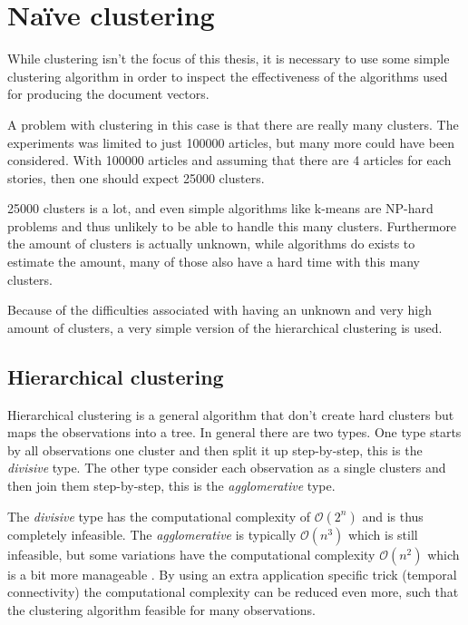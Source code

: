 \section{Naïve clustering}

While clustering isn't the focus of this thesis, it is necessary to use some simple clustering algorithm in order to inspect the effectiveness of the algorithms used for producing the document vectors.

A problem with clustering in this case is that there are really many clusters. The experiments was limited to just 100000 articles, but many more could have been considered. With 100000 articles and assuming that there are 4 articles for each stories, then one should expect 25000 clusters.

25000 clusters is a lot, and even simple algorithms like k-means are NP-hard problems and thus unlikely to be able to handle this many clusters. Furthermore the amount of clusters is actually unknown, while algorithms do exists to estimate the amount, many of those also have a hard time with this many clusters.

Because of the difficulties associated with having an unknown and very high amount of clusters, a very simple version of the hierarchical clustering is used.

\subsection{Hierarchical clustering}

Hierarchical clustering is a general algorithm that don't create hard clusters but maps the observations into a tree. In general there are two types. One type starts by all observations one cluster and then split it up step-by-step, this is the \textit{divisive} type. The other type consider each observation as a single clusters and then join them step-by-step, this is the \textit{agglomerative} type.

The \textit{divisive} type has the computational complexity of $\mathcal{O}(2^n)$ and is thus completely infeasible. The \textit{agglomerative} is typically $\mathcal{O}(n^3)$ which is still infeasible, but some variations have the computational complexity $\mathcal{O}(n^2)$ which is a bit more manageable \cite{wiki-hcluster}. By using an extra application specific trick (temporal connectivity) the computational complexity can be reduced even more, such that the clustering algorithm feasible for many observations.

